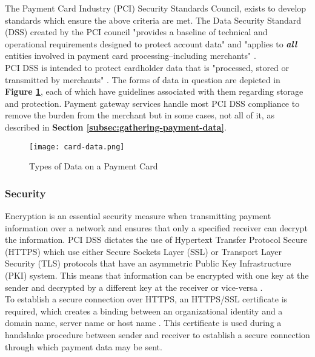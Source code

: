 The Payment Card Industry (PCI) Security Standards Council, exists to develop standards which ensure the above criteria are met. The Data Security Standard (DSS) created by the PCI council "provides a baseline of technical and operational requirements designed to protect account data" and "applies to \textit{\textbf{all}} entities involved in payment card processing--including merchants" \cite{PCI-DSS}.\\

PCI DSS is intended to protect cardholder data that is "processed, stored or transmitted by merchants" \cite{PCI-DSS}. The forms of data in question are depicted in \textbf{Figure \ref{fig:card-data}}, each of which have guidelines associated with them regarding storage and protection. Payment gateway services handle most PCI DSS compliance to remove the burden from the merchant but in some cases, not all of it, as described in \textbf{Section \ref{subsec:gathering-payment-data}}.

\begin{figure}[!hbt]
  	\centering
 	\texttt{[image: card-data.png]}
  	\caption{Types of Data on a Payment Card\cite{card-data}}
 	\label{fig:card-data}
\end{figure}

\subsubsection{Security}
\label{subsec:security}

Encryption is an essential security measure when transmitting payment information over a network and ensures that only a specified receiver can decrypt the information. PCI DSS dictates the use of Hypertext Transfer Protocol Secure (HTTPS) which use either Secure Sockets Layer (SSL) or Transport Layer Security (TLS) protocols that have an asymmetric Public Key Infrastructure (PKI) system. This means that information can be encrypted with one key at the sender and decrypted by a different key at the receiver or vice-versa \cite{comodo}.\\

To establish a secure connection over HTTPS, an HTTPS/SSL certificate is required, which creates a binding between an organizational identity and a domain name, server name or host name \cite{ssl-certificate}. This certificate is used during a handshake procedure between sender and receiver to establish a secure connection through which payment data may be sent.

